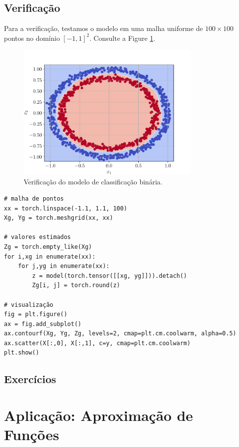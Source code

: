 \subsection{Verificação}
\badgeConstrucao

Para a verificação, testamos o modelo em uma malha uniforme de $100\times 100$ pontos no domínio $[-1, 1]^2$. Consulte a Figure \ref{cap_mlp_sec_classbin:fig:result}.

\begin{figure}[H]
  \centering
  \includegraphics[width=0.8\textwidth]{./cap_mlp/dados/fig_classbin_result/fig}
  \caption{Verificação do modelo de classificação binária.}
  \label{cap_mlp_sec_classbin:fig:result}
\end{figure}


\begin{lstlisting}
# malha de pontos
xx = torch.linspace(-1.1, 1.1, 100)
Xg, Yg = torch.meshgrid(xx, xx)

# valores estimados
Zg = torch.empty_like(Xg)
for i,xg in enumerate(xx):
    for j,yg in enumerate(xx):
        z = model(torch.tensor([[xg, yg]])).detach()
        Zg[i, j] = torch.round(z)

# visualização
fig = plt.figure()
ax = fig.add_subplot()
ax.contourf(Xg, Yg, Zg, levels=2, cmap=plt.cm.coolwarm, alpha=0.5)
ax.scatter(X[:,0], X[:,1], c=y, cmap=plt.cm.coolwarm)
plt.show()
\end{lstlisting}

\subsection{Exercícios}
\badgeConstrucao


\section{Aplicação: Aproximação de Funções}\label{cap_mlp_sec_apfun}

